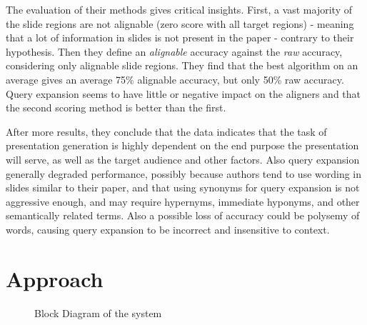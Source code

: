\documentclass[10pt,twocolumn,letterpaper]{article}
\begin{document}
The evaluation of their methods gives critical insights. First, a vast majority of the slide regions are
not alignable (zero score with all target regions) - meaning that a lot of information in slides is not
present in the paper - contrary to their hypothesis. Then they define an \textit{alignable} accuracy against
the \textit{raw} accuracy, considering only alignable slide regions. They find that the best algorithm
on an average gives an average 75\% alignable accuracy, but only 50\% raw accuracy. Query expansion seems
to have little or negative impact on the aligners and that the second scoring method is better than
the first.

After more results, they conclude that the data indicates that the task of presentation generation
is highly dependent on the end purpose the presentation will serve, as well as the target audience and other
factors. Also query expansion generally degraded performance, possibly because authors tend to use wording in
slides similar to their paper, and that using synonyms for query expansion is not aggressive enough, and may
require hypernyms, immediate hyponyms, and other semantically related terms. Also a possible loss of accuracy
could be polysemy of words, causing query expansion to be incorrect and insensitive to context.



\section{Approach}


\begin{figure*}
\begin{center}
\fbox{\rule{0pt}{2in} \rule{.9\linewidth}{0pt}}
\end{center}
   \caption{Block Diagram of the system}
\label{fig:short}
\end{figure*}





\end{document}
